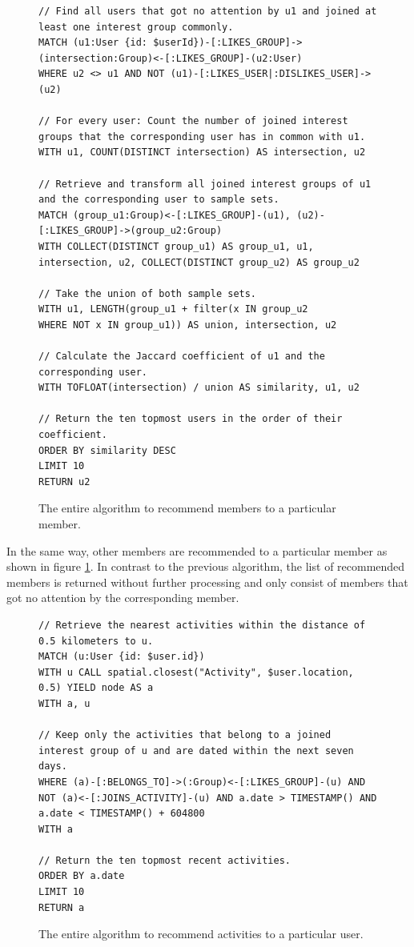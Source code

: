 \documentclass[12pt,numbers=noenddot,parskip,bibliography=totocnumbered,listof=totocnumbered,draft]{scrreprt}
\begin{document}
\begin{figure}
\centering
\begin{lstlisting}
// Find all users that got no attention by u1 and joined at least one interest group commonly.
MATCH (u1:User {id: $userId})-[:LIKES_GROUP]->(intersection:Group)<-[:LIKES_GROUP]-(u2:User) 
WHERE u2 <> u1 AND NOT (u1)-[:LIKES_USER|:DISLIKES_USER]->(u2) 

// For every user: Count the number of joined interest groups that the corresponding user has in common with u1.
WITH u1, COUNT(DISTINCT intersection) AS intersection, u2 

// Retrieve and transform all joined interest groups of u1 and the corresponding user to sample sets.
MATCH (group_u1:Group)<-[:LIKES_GROUP]-(u1), (u2)-[:LIKES_GROUP]->(group_u2:Group) 
WITH COLLECT(DISTINCT group_u1) AS group_u1, u1, intersection, u2, COLLECT(DISTINCT group_u2) AS group_u2 

// Take the union of both sample sets.
WITH u1, LENGTH(group_u1 + filter(x IN group_u2 
WHERE NOT x IN group_u1)) AS union, intersection, u2 

// Calculate the Jaccard coefficient of u1 and the corresponding user. 
WITH TOFLOAT(intersection) / union AS similarity, u1, u2 

// Return the ten topmost users in the order of their coefficient.
ORDER BY similarity DESC 
LIMIT 10
RETURN u2
\end{lstlisting}
\caption[Algorithm to recommend members]{The entire algorithm to recommend members to a particular member.}
\label{recommendationalgorithmmembers}
\end{figure}

In the same way, other members are recommended to a particular member as shown in figure \ref{recommendationalgorithmmembers}. In contrast to the previous algorithm, the list of recommended members is returned without further processing and only consist of members that got no attention by the corresponding member.

\begin{figure}
\centering
\begin{lstlisting}
// Retrieve the nearest activities within the distance of 0.5 kilometers to u.
MATCH (u:User {id: $user.id})
WITH u CALL spatial.closest("Activity", $user.location, 0.5) YIELD node AS a 
WITH a, u 

// Keep only the activities that belong to a joined interest group of u and are dated within the next seven days.
WHERE (a)-[:BELONGS_TO]->(:Group)<-[:LIKES_GROUP]-(u) AND NOT (a)<-[:JOINS_ACTIVITY]-(u) AND a.date > TIMESTAMP() AND a.date < TIMESTAMP() + 604800 
WITH a

// Return the ten topmost recent activities.
ORDER BY a.date 
LIMIT 10
RETURN a
\end{lstlisting}
\caption[Algorithm to recommend activities]{The entire algorithm to recommend activities to a particular user.}
\label{recommendationalogirthmactivities}
\end{figure}
\end{document}
